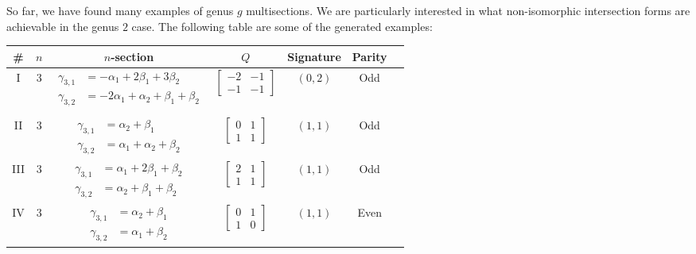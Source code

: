 So far, we have found many examples of genus $g$ multisections. We are particularly interested in what non-isomorphic intersection forms are achievable in the genus $2$ case. The following table are some of the generated examples:
\begin{center}
	\begin{tabular}{|c|c|c|c|c|c|c|}
		\hline
		\# & $n$ & $n$-section & $Q$ & Signature & Parity\\%
		\hline
		I & $3$ & \parbox{4.25cm}{\begin{align*}
			\gamma_{3,1} &= -\alpha_1 + 2\beta_1 + 3\beta_2\\
			\gamma_{3,2} &= -2\alpha_1 + \alpha_2 + \beta_1 + \beta_2\\
		\end{align*}} & $\begin{bmatrix} -2 & -1\\-1 & -1 \end{bmatrix}$ & $(0,2)$ & Odd\\%
		\hline
		II & $3$ & \parbox{4.25cm}{\begin{align*}
			\gamma_{3,1} &= \alpha_2 + \beta_1\\
			\gamma_{3,2} &= \alpha_1 + \alpha_2 + \beta_2
		\end{align*}} & $\begin{bmatrix} 0 & 1\\1 & 1 \end{bmatrix}$ & $(1,1)$ & Odd\\%
		\hline
		III & $3$ & \parbox{4.25cm}{\begin{align*}
			\gamma_{3,1} &= \alpha_1 + 2\beta_1 + \beta_2\\
			\gamma_{3,2} &= \alpha_2 + \beta_1 + \beta_2
		\end{align*}} & $\begin{bmatrix} 2 & 1\\1 & 1 \end{bmatrix}$ & $(1,1)$ & Odd\\%
		\hline
		IV & $3$ & \parbox{4.25cm}{\begin{align*}
			\gamma_{3,1} &= \alpha_2 + \beta_1\\
			\gamma_{3,2} &= \alpha_1 + \beta_2
		\end{align*}} & $\begin{bmatrix} 0 & 1\\1 & 0 \end{bmatrix}$ & $(1,1)$ & Even\\%

\end{tabular}
\end{center}
